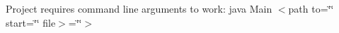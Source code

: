 Project requires command line arguments to work\+: java Main $<$path to=\char`\"{}\char`\"{} start=\char`\"{}\char`\"{} file$>$=\char`\"{}\char`\"{}$>$ 